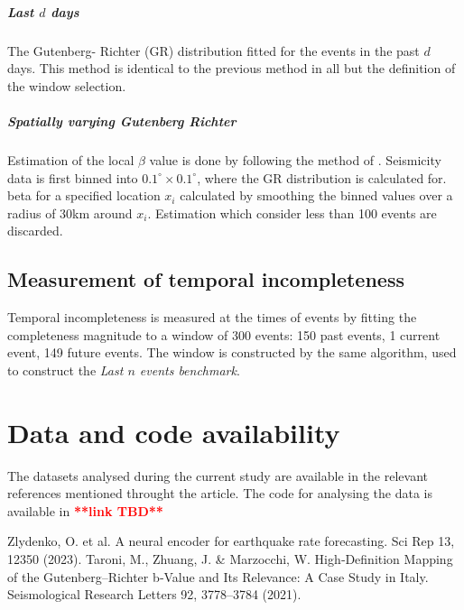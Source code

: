 \documentclass[pdflatex]{sn-jnl}
\begin{document}
\subparagraph{Last $d$ days} The Gutenberg- Richter (GR) distribution fitted for the events in the past $d$ days. This method is identical to the previous method in all but the definition of the window selection.


\subparagraph{Spatially varying Gutenberg Richter} Estimation of the local $\beta$ value is done by following the method of \cite{taroni_highdefinition_2021}. Seismicity data is first binned into $0.1^\circ \times 0.1^\circ$, where the GR distribution is calculated for. beta for a specified location $x_i$ calculated by smoothing the binned values over a radius of 30km around $x_i$. Estimation which consider less than 100 events are discarded.

\subsection{Measurement of temporal incompleteness}
Temporal incompleteness is measured at the times of events by fitting the completeness magnitude to a window of 300 events: 150 past events, 1 current event, 149 future events. The window is constructed by the same algorithm, used to construct the \textit{Last $n$ events benchmark}.




\section*{Data and code availability}
The datasets analysed during the current study are available in the relevant references mentioned throught the article.
The code for analysing the data is available in \textcolor{red}{\textbf{**link TBD**}}

\newpage
\renewcommand\refname{Methods References}
\begin{thebibliography}{10}
Zlydenko, O. et al. A neural encoder for earthquake rate forecasting. Sci Rep 13, 12350 (2023).
Taroni, M., Zhuang, J. \& Marzocchi, W. High‐Definition Mapping of the Gutenberg–Richter b‐Value and Its Relevance: A Case Study in Italy. Seismological Research Letters 92, 3778–3784 (2021).
  





\end{thebibliography}
\end{document}
